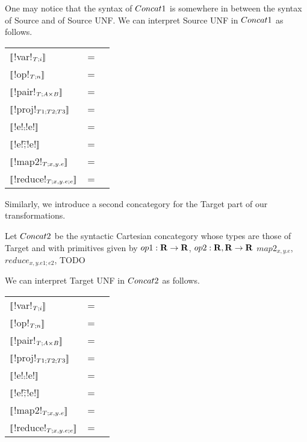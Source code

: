 One may notice that the syntax of $Concat1$ is somewhere in between the syntax of Source and of Source UNF.
We can interpret Source UNF in $Concat1$ as follows.

\begin{tabular}{l c r}
   $\llbracket$!var!$_{T;i} \rrbracket$ &=& \\
   $\llbracket$!op!$_{T;n} \rrbracket$ &=& \\
   $\llbracket$!pair!$_{T;A\times B} \rrbracket$ &=& \\
   $\llbracket$!proj!$_{T1;T2;T3} \rrbracket$ &=& \\
   $\llbracket$!e!$\comp$!e!$\rrbracket$  &=& \\
   $\llbracket$!e!$\widetilde{;}$!e!$\rrbracket$ &=& \\
   $\llbracket$!map2!$_{T;x,y.e}\rrbracket$  &=& \\
   $\llbracket$!reduce!$_{T;x,y.e;e}\rrbracket$  &=& \\
\end{tabular}

Similarly, we introduce a second concategory for the Target part of our transformations.

\begin{definition}[$\ConcatT$]
Let $\ConcatT$ be the syntactic Cartesian concategory whose types are those of Target and 
with primitives given by $op1: \mathbf{R} \to \mathbf{R}$, $op2: \mathbf{R},\mathbf{R} \to \mathbf{R}$ $map2_{x,y.e}$, 
$reduce_{x,y.e1;e2}$, TODO
\end{definition}

We can interpret Target UNF in $\ConcatT$ as follows.

\begin{tabular}{l c r}
    $\llbracket$!var!$_{T;i} \rrbracket$ &=& \\
    $\llbracket$!op!$_{T;n} \rrbracket$ &=& \\
    $\llbracket$!pair!$_{T;A\times B} \rrbracket$ &=& \\
    $\llbracket$!proj!$_{T1;T2;T3} \rrbracket$ &=& \\
    $\llbracket$!e!$\comp$!e!$\rrbracket$  &=& \\
    $\llbracket$!e!$\widetilde{;}$!e!$\rrbracket$ &=& \\
    $\llbracket$!map2!$_{T;x,y.e}\rrbracket$  &=& \\
    $\llbracket$!reduce!$_{T;x,y.e;e}\rrbracket$  &=& \\
 \end{tabular}

